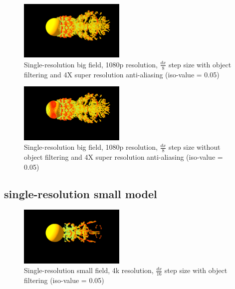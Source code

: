 \documentclass[acmtog]{acmart}
\begin{document}
    \begin{figure}[H]
        \centering
        \includegraphics[width=0.45\textwidth]{./image/single_big_1080p_8_filter_4XRES}
        \caption{Single-resolution big field, 1080p resolution, $ \frac{dx}{8} $ step size with object filtering and 4X super resolution anti-aliasing (iso-value = 0.05)}\label{fig:figure11}
    \end{figure}

    \begin{figure}[H]
        \centering
        \includegraphics[width=0.45\textwidth]{./image/single_big_1080p_8_no_filter_4XRES}
        \caption{Single-resolution big field, 1080p resolution, $ \frac{dx}{8} $ step size without object filtering and 4X super resolution anti-aliasing (iso-value = 0.05)}\label{fig:figure12}
    \end{figure}

    \subsection{single-resolution small model}\label{subsec:single-resolution-small-model}
    \begin{figure}[H]
        \centering
        \includegraphics[width=0.45\textwidth]{./image/single_small_4k_16_filter}
        \caption{Single-resolution small field, 4k resolution, $ \frac{dx}{16} $ step size with object filtering (iso-value = 0.05)}\label{fig:figure13}
    \end{figure}
\end{document}

